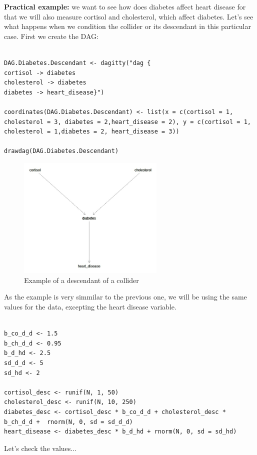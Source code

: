 \documentclass{article}
\begin{document}
\textbf{Practical example:} we want to see how does diabetes affect heart disease for that we will also measure cortisol and cholesterol, which affect diabetes. Let's see what happens when we condition the collider or its descendant in this particular case. First we create the DAG:

\begin{lstlisting}

DAG.Diabetes.Descendant <- dagitty("dag {
cortisol -> diabetes
cholesterol -> diabetes
diabetes -> heart_disease}")

coordinates(DAG.Diabetes.Descendant) <- list(x = c(cortisol = 1, cholesterol = 3, diabetes = 2,heart_disease = 2), y = c(cortisol = 1, cholesterol = 1,diabetes = 2, heart_disease = 3))

drawdag(DAG.Diabetes.Descendant)

\end{lstlisting}

\begin{figure}[h]
\caption{Example of a descendant of a collider}
\includegraphics[width=7cm]{DAG_DESCENDANT_DIAB.png}
\centering
\end{figure}

As the example is very simmilar to the previous one, we will be using the same values for the data, excepting the heart disease variable.\par
\begin{lstlisting}
 
b_co_d_d <- 1.5
b_ch_d_d <- 0.95
b_d_hd <- 2.5
sd_d_d <- 5
sd_hd <- 2

cortisol_desc <- runif(N, 1, 50)
cholesterol_desc <- runif(N, 10, 250)
diabetes_desc <- cortisol_desc * b_co_d_d + cholesterol_desc * b_ch_d_d +  rnorm(N, 0, sd = sd_d_d)
heart_disease <- diabetes_desc * b_d_hd + rnorm(N, 0, sd = sd_hd)

\end{lstlisting}

Let's check the values...\par
\end{document}
